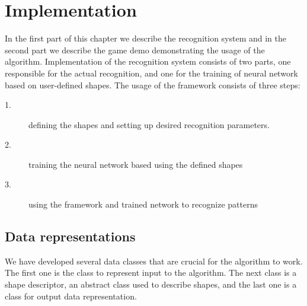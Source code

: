 \chapter{Implementation}
In the first part of this chapter we describe the recognition system and in the second part we describe the game demo demonstrating the usage of the algorithm. Implementation of the recognition system consists of two parts, one responsible for the actual recognition, and one for the training of neural network based on user-defined shapes. The usage of the framework consists of three steps:
\begin{description}
\item[1.] defining the shapes and setting up desired recognition parameters.
\item[2.] training the neural network based using the defined shapes
\item[3.] using the framework and trained network to recognize patterns
\end{description}

\section{Data representations}
We have developed several data classes that are crucial for the algorithm to work. The first one is the class to represent input to the algorithm. The next class is a shape descriptor, an abstract class used to describe shapes, and the last one is a class for output data representation.

